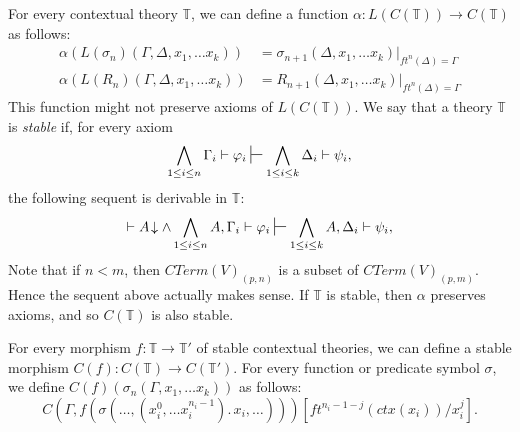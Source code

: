 \documentclass[reqno]{amsart}
\theoremstyle{definition}
\theoremstyle{remark}
\numberwithin{figure}{section}
\begin{document}
For every contextual theory $\mathbb{T}$, we can define a function $\alpha : L(C(\mathbb{T})) \to C(\mathbb{T})$ as follows:
\begin{align*}
\alpha(L(\sigma_n)(\Gamma, \Delta, x_1, \ldots x_k)) & = \sigma_{n+1}(\Delta, x_1, \ldots x_k)|_{ft^n(\Delta) = \Gamma} \\
\alpha(L(R_n)(\Gamma, \Delta, x_1, \ldots x_k)) & = R_{n+1}(\Delta, x_1, \ldots x_k)|_{ft^n(\Delta) = \Gamma}
\end{align*}
This function might not preserve axioms of $L(C(\mathbb{T}))$.
We say that a theory $\mathbb{T}$ is \emph{stable} if, for every axiom
\[ \bigwedge_{1 \leq i \leq n} \Gamma_i \vdash \varphi_i \sststile{}{} \bigwedge_{1 \leq i \leq k} \Delta_i \vdash \psi_i, \]
the following sequent is derivable in $\mathbb{T}$:
\[ \vdash A\!\downarrow \land \bigwedge_{1 \leq i \leq n} A, \Gamma_i \vdash \varphi_i \sststile{}{} \bigwedge_{1 \leq i \leq k} A, \Delta_i \vdash \psi_i, \]
Note that if $n < m$, then $CTerm(V)_{(p,n)}$ is a subset of $CTerm(V)_{(p,m)}$.
Hence the sequent above actually makes sense.
If $\mathbb{T}$ is stable, then $\alpha$ preserves axioms, and so $C(\mathbb{T})$ is also stable.

For every morphism $f : \mathbb{T} \to \mathbb{T}'$ of stable contextual theories, we can define a stable morphism $C(f) : C(\mathbb{T}) \to C(\mathbb{T}')$.
For every function or predicate symbol $\sigma$, we define $C(f)(\sigma_n(\Gamma, x_1, \ldots x_k))$ as follows:
\[ C(\Gamma, f(\sigma(\ldots, (x^0_i, \ldots x^{n_i-1}_i).\,x_i, \ldots)))[ft^{n_i-1-j}(ctx(x_i))/x^j_i]. \]
\end{document}
